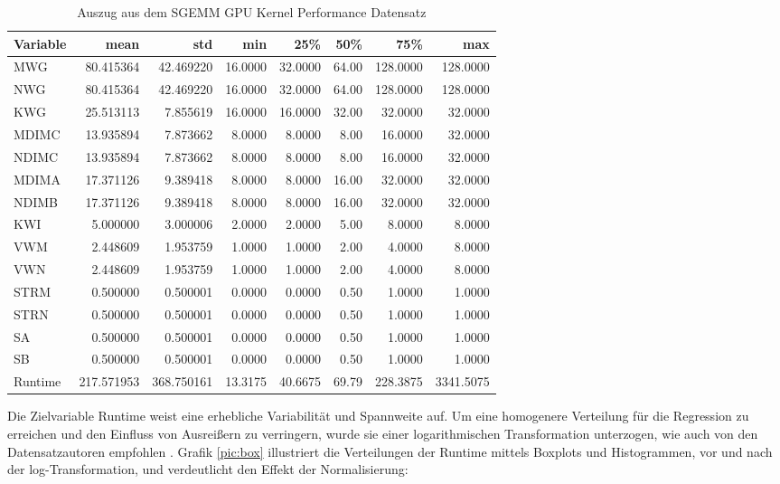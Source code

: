 \begin{table}[!h]
    \caption{Auszug aus dem SGEMM GPU Kernel Performance Datensatz}
    \footnotesize
    \begin{tabularx}{\textwidth}{Xrrrrrrr}
    \toprule
    Variable & mean & std & min & 25\% & 50\% & 75\% & max \\
    \midrule
    MWG & 80.415364 & 42.469220 & 16.0000 & 32.0000 & 64.00 & 128.0000 & 128.0000 \\
    NWG & 80.415364 & 42.469220 & 16.0000 & 32.0000 & 64.00 & 128.0000 & 128.0000 \\
    KWG & 25.513113 & 7.855619 & 16.0000 & 16.0000 & 32.00 & 32.0000 & 32.0000 \\
    MDIMC & 13.935894 & 7.873662 & 8.0000 & 8.0000 & 8.00 & 16.0000 & 32.0000 \\
    NDIMC & 13.935894 & 7.873662 & 8.0000 & 8.0000 & 8.00 & 16.0000 & 32.0000 \\
    MDIMA & 17.371126 & 9.389418 & 8.0000 & 8.0000 & 16.00 & 32.0000 & 32.0000 \\
    NDIMB & 17.371126 & 9.389418 & 8.0000 & 8.0000 & 16.00 & 32.0000 & 32.0000 \\
    KWI & 5.000000 & 3.000006 & 2.0000 & 2.0000 & 5.00 & 8.0000 & 8.0000 \\
    VWM & 2.448609 & 1.953759 & 1.0000 & 1.0000 & 2.00 & 4.0000 & 8.0000 \\
    VWN & 2.448609 & 1.953759 & 1.0000 & 1.0000 & 2.00 & 4.0000 & 8.0000 \\
    STRM & 0.500000 & 0.500001 & 0.0000 & 0.0000 & 0.50 & 1.0000 & 1.0000 \\
    STRN & 0.500000 & 0.500001 & 0.0000 & 0.0000 & 0.50 & 1.0000 & 1.0000 \\
    SA & 0.500000 & 0.500001 & 0.0000 & 0.0000 & 0.50 & 1.0000 & 1.0000 \\
    SB & 0.500000 & 0.500001 & 0.0000 & 0.0000 & 0.50 & 1.0000 & 1.0000 \\
    Runtime & 217.571953 & 368.750161 & 13.3175 & 40.6675 & 69.79 & 228.3875 & 3341.5075 \\
    \bottomrule
    \end{tabularx}
    \label{tab:statistics}
    \normalsize
\end{table}

Die Zielvariable Runtime weist eine erhebliche Variabilität und Spannweite auf. 
Um eine homogenere Verteilung für die Regression zu erreichen und den Einfluss 
von Ausreißern zu verringern, wurde sie einer logarithmischen Transformation unterzogen, 
wie auch von den Datensatzautoren empfohlen \cite{misc_sgemm_gpu_kernel_performance_440}. 
Grafik \ref{pic:box} illustriert die Verteilungen der Runtime mittels Boxplots und Histogrammen, 
vor und nach der log-Transformation, und verdeutlicht den Effekt der Normalisierung:

